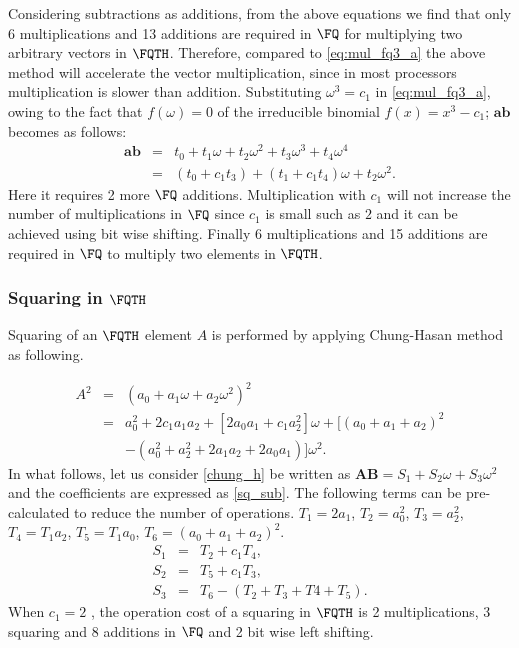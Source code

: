 Considering subtractions as additions, from the above equations we find that only 6 multiplications and 13 additions are required in $\FQ$ for multiplying two arbitrary vectors in $\FQTH$. Therefore, compared to \eqref{eq:mul_fq3_a} the above method will accelerate the vector multiplication, since in most processors multiplication is slower than addition. Substituting $\omega^3 = c_1$ in \eqref{eq:mul_fq3_a}, owing to the fact that $f(\omega) = 0$ of the irreducible binomial $f(x)=x^3-c_1$; $\textbf{ab}$ becomes as follows:
\begin{eqnarray}\label{fq_3_t}
\textbf{ab} & = & t_0 + t_1\omega + t_2\omega^2 + t_3 \omega^3 + t_4\omega^4 \nonumber \\
& = & (t_0 + c_1 t_3 ) + (t_1+c_1 t_4)\omega + t_2\omega^2.
\end{eqnarray}
Here it requires 2 more $\FQ$ additions. Multiplication with  $c_1$  will not increase the number of multiplications in $\FQ$ since $c_1$ is small such as $2$ and it can be achieved using bit wise shifting. Finally 6 multiplications and 15 additions are required in $\FQ$ to multiply two elements in $\FQTH$.

\subsubsection{Squaring in $\FQTH$}
Squaring of an $\FQTH$  element $A$ is performed by applying Chung-Hasan method \cite{chung2007asymmetric} as following.

\begin{eqnarray}\label{chung_h}
A^2 & = & (a_0 + a_1\omega + a_2\omega^2)^2 \nonumber\\
& =  & a_0^2 +2c_1a_1a_2 +[2a_0a_1 +c_1a_2^2]\omega+[(a_0 +a_1 +a_2)^2 \nonumber \\
&&-(a_0^2 + a_2^2 + 2a_1a_2 + 2a_0a_1)]\omega^2.
\end{eqnarray}
In what follows, let us consider \eqref{chung_h} be written as $\textbf{AB} = S_1 +S_2\omega + S_3\omega^2$ and  the coefficients are expressed as \eqref{sq_sub}. The following terms can be pre-calculated to reduce the number of operations. $ T_1= 2a_1$, $T_2 = a_0^2$, $T_3=a_2^2$, $T_4=T_1a_2$, $T_5=T_1a_0$, $T_6 = (a_0+a_1+a_2)^2$.
\begin{subequations} \label{sq_sub}
\begin{eqnarray}
S_1 & = & T_2+c_1T_4, \\
S_2 & = & T_5+c_1T_3,\\
S_3 & = & T_6 - (T_2+T_3+T4+T_5).
\end{eqnarray}
\end{subequations}
When $c_1 = 2$ , the operation cost of a squaring in $\FQTH$ is 2 multiplications, 3 squaring and 8 additions in $\FQ$ and 2 bit wise left shifting.
